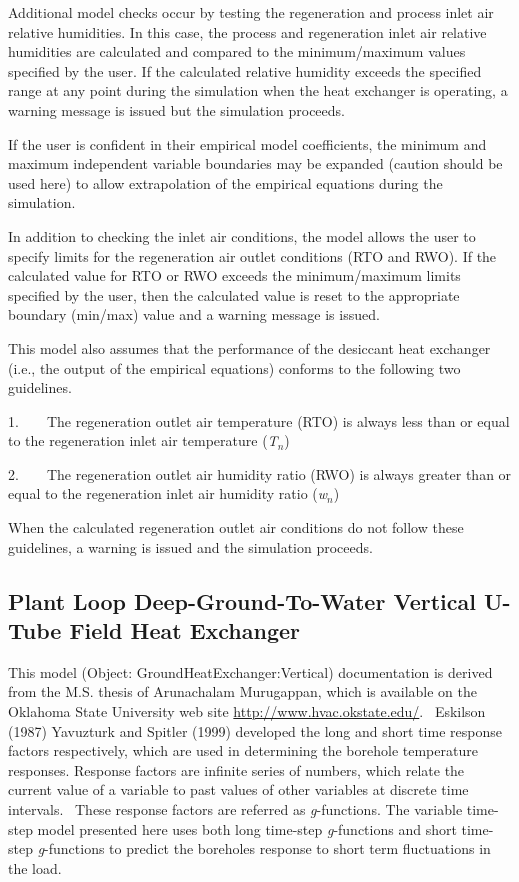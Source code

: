 Additional model checks occur by testing the regeneration and process inlet air relative humidities. In this case, the process and regeneration inlet air relative humidities are calculated and compared to the minimum/maximum values specified by the user. If the calculated relative humidity exceeds the specified range at any point during the simulation when the heat exchanger is operating, a warning message is issued but the simulation proceeds.

If the user is confident in their empirical model coefficients, the minimum and maximum independent variable boundaries may be expanded (caution should be used here) to allow extrapolation of the empirical equations during the simulation.

In addition to checking the inlet air conditions, the model allows the user to specify limits for the regeneration air outlet conditions (RTO and RWO). If the calculated value for RTO or RWO exceeds the minimum/maximum limits specified by the user, then the calculated value is reset to the appropriate boundary (min/max) value and a warning message is issued.

This model also assumes that the performance of the desiccant heat exchanger (i.e., the output of the empirical equations) conforms to the following two guidelines.

1.~~~~The regeneration outlet air temperature (RTO) is always less than or equal to the regeneration inlet air temperature (\emph{T\(_{n}\)})

2.~~~~The regeneration outlet air humidity ratio (RWO) is always greater than or equal to the regeneration inlet air humidity ratio (\emph{w\(_{n}\)})

When the calculated regeneration outlet air conditions do not follow these guidelines, a warning is issued and the simulation proceeds.

\subsection{Plant Loop Deep-Ground-To-Water Vertical U-Tube Field Heat Exchanger}\label{plant-loop-deep-ground-to-water-vertical-u-tube-field-heat-exchanger}

This model (Object: GroundHeatExchanger:Vertical) documentation is derived from the M.S. thesis of Arunachalam Murugappan, which is available on the Oklahoma State University web site \url{http://www.hvac.okstate.edu/}.~ Eskilson (1987) Yavuzturk and Spitler (1999) developed the long and short time response factors respectively, which are used in determining the borehole temperature responses. Response factors are infinite series of numbers, which relate the current value of a variable to past values of other variables at discrete time intervals.~ These response factors are referred as \emph{g}-functions. The variable time-step model presented here uses both long time-step \emph{g}-functions and short time-step \emph{g}-functions to predict the boreholes response to short term fluctuations in the load.

